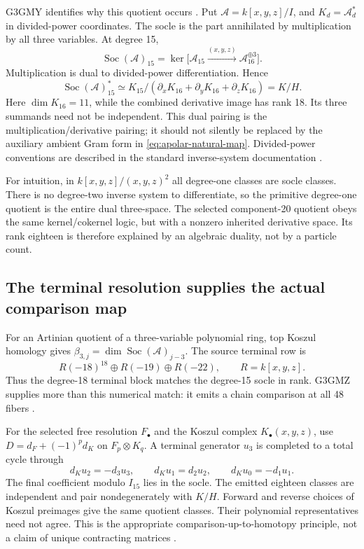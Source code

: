 \documentclass[11pt,a4paper]{article}
\begin{document}
G3GMY identifies why this quotient occurs
\cite{UnifiedSocleDuality2026}. Put \(\mathcal A=k[x,y,z]/I\), and
\(K_d=\mathcal A_d^*\) in divided-power coordinates. The socle is the
part annihilated by multiplication by all three variables. At degree 15,
\[
 \operatorname{Soc}(\mathcal A)_{15}
 =\ker\bigl[\mathcal A_{15}\xrightarrow{(x,y,z)}
                  \mathcal A_{16}^{\oplus3}\bigr].
\]
Multiplication is dual to divided-power differentiation. Hence
\[
 \operatorname{Soc}(\mathcal A)_{15}^*
 \simeq K_{15}/
 (\partial_xK_{16}+\partial_yK_{16}+\partial_zK_{16})
 =K/H.
 \tag{P9}\label{eq:apolar-socle-duality}
\]
Here \(\dim K_{16}=11\), while the combined derivative image has rank
18. Its three summands need not be independent.
This dual pairing is the multiplication/derivative pairing; it should
not silently be replaced by the auxiliary ambient Gram form in
\eqref{eq:apolar-natural-map}. Divided-power conventions are described
in the standard inverse-system documentation \cite{MacaulayInverseSystems}.

For intuition, in \(k[x,y,z]/(x,y,z)^2\) all degree-one classes are
socle classes. There is no degree-two inverse system to differentiate,
so the primitive degree-one quotient is the entire dual three-space.
The selected component-20 quotient obeys the same kernel/cokernel logic,
but with a nonzero inherited derivative space. Its rank eighteen is
therefore explained by an algebraic duality, not by a particle count.

\subsection{The terminal resolution supplies the actual comparison map}
\label{sec:apolar-terminal-map}

For an Artinian quotient of a three-variable polynomial ring, top Koszul
homology gives
\(\beta_{3,j}=\dim\operatorname{Soc}(\mathcal A)_{j-3}\).
The source terminal row is
\[
 R(-18)^{18}\oplus R(-19)\oplus R(-22),
 \qquad R=k[x,y,z].
\]
Thus the degree-18 terminal block matches the degree-15 socle in rank.
G3GMZ supplies more than this numerical match: it emits a chain comparison
at all 48 fibers \cite{UnifiedTerminalChain2026}.

For the selected free resolution \(F_\bullet\) and the Koszul complex
\(K_\bullet(x,y,z)\), use
\(D=d_F+(-1)^p d_K\) on \(F_p\otimes K_q\).
A terminal generator \(u_3\) is completed to a total cycle through
\[
 d_Ku_2=-d_3u_3,\qquad
 d_Ku_1=d_2u_2,\qquad
 d_Ku_0=-d_1u_1.
 \tag{P10}\label{eq:apolar-terminal-zigzag}
\]
The final coefficient modulo \(I_{15}\) lies in the socle. The emitted
eighteen classes are independent and pair nondegenerately with \(K/H\).
Forward and reverse choices of Koszul preimages give the same quotient
classes. Their polynomial representatives need not agree.
This is the appropriate comparison-up-to-homotopy principle, not a
claim of unique contracting matrices \cite{StacksResolutionComparison}.
\end{document}
